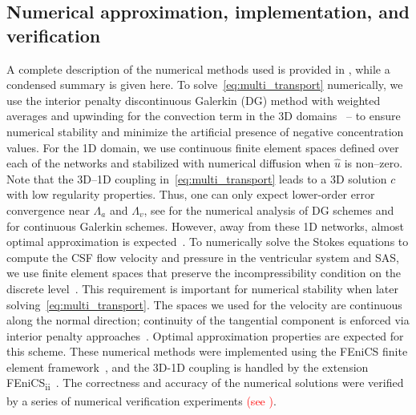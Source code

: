 \documentclass[fleqn,10pt]{wlscirep}
\newcommand{\fixme}[1]{\textcolor{red}{#1}}
\begin{document}
\subsection*{Numerical approximation, implementation, and  verification}

A complete description of the numerical methods used is provided in
, while a condensed summary is
given here. To solve~\eqref{eq:multi_transport} numerically, we use
the interior penalty discontinuous Galerkin (DG) method with weighted
averages and upwinding for the convection term in the 3D
domains~\cite{ern2009discontinuous} -- to ensure numerical stability
and minimize the artificial presence of negative concentration
values. For the 1D domain, we use continuous finite element spaces
defined over each of the networks and stabilized with numerical
diffusion when $\hat{u}$ is non--zero. Note that the 3D--1D coupling
in~\eqref{eq:multi_transport} leads to a 3D solution $c$ with low regularity properties. Thus, one can only expect lower-order error convergence near
$\Lambda_a$ and $\Lambda_v$, see \cite{masri2023discontinuous} for the numerical analysis of DG schemes and \cite{laurino2019derivation} for continuous Galerkin schemes.  However, away from these 1D networks, almost
optimal approximation is expected~\cite{masri2023discontinuous,koppl2016local}. To numerically solve the Stokes equations to
compute the CSF flow velocity and pressure in the ventricular system
and SAS, we use finite element spaces that preserve the
incompressibility condition on the discrete
level~\cite{hong2016robust}. This requirement is important for
numerical stability when later
solving~\eqref{eq:multi_transport}\cite{cesmelioglu2022compatible}. The
spaces we used for the velocity are continuous along the normal
direction; continuity of the tangential component is enforced via
interior penalty approaches~\cite{hong2016robust}. Optimal
approximation properties are expected for this scheme. These numerical
methods were implemented using the FEniCS finite element
framework~\cite{alnaes2015fenics}, and the 3D-1D coupling is handled
by the extension
FEniCS\textsubscript{ii}~\cite{kuchta2020assembly}. The correctness
and accuracy of the numerical solutions were verified by a series of
numerical verification experiments \fixme{(see )}.

\end{document}
